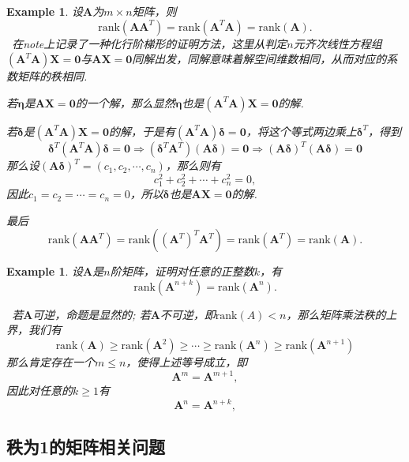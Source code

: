 \documentclass{article}
\newtheorem{example}[theorem]{Example}
\newcommand{\hints}{{\color{blue} \text{hints}}}
\newcommand{\mbf}[1]{\bm{#1}}
\newcommand{\rank}[1]{\text{rank}\left(#1\right)} %
\begin{document}
\begin{example}
\rm 设$\mbf{A}$为$m \times n$矩阵，则
$$
\rank{\mbf{A}\mbf{A}^T} = \rank{\mbf{A}^T\mbf{A}} = \rank{\mbf{A}}. 
$$
\hints\ 在note上记录了一种化行阶梯形的证明方法，这里从判定$n$元齐次线性方程组$(\mbf{A}^T\mbf{A})\mbf{X}=\mbf{0}$与$\mbf{A}\mbf{X}= \mbf{0}$同解出发，同解意味着解空间维数相同，从而对应的系数矩阵的秩相同. 

若$\mbf{\eta}$是$\mbf{A}\mbf{X}= \mbf{0}$的一个解，那么显然$\mbf{\eta}$也是$(\mbf{A}^T\mbf{A})\mbf{X}=\mbf{0}$的解. 

若$\mbf{\delta}$是$(\mbf{A}^T\mbf{A})\mbf{X}=\mbf{0}$的解，于是有$(\mbf{A}^T\mbf{A})\mbf{\delta}=\mbf{0}$，将这个等式两边乘上$\mbf{\delta}^T$，得到
$$
\mbf{\delta}^T(\mbf{A}^T\mbf{A})\mbf{\delta}=\mbf{0} \Rightarrow (\mbf{\delta}^T\mbf{A}^T)(\mbf{A}\mbf{\delta})=\mbf{0} \Rightarrow (\mbf{A}\mbf{\delta})^T(\mbf{A}\mbf{\delta})=\mbf{0}
$$
那么设$(\mbf{A}\mbf{\delta})^T = (c_1,c_2,\cdots,c_n)$，那么则有
$$
c_1^2 + c_2^2 + \cdots + c_n^2 = 0,
$$
因此$c_1 = c_2 = \cdots = c_n = 0$，所以$\mbf{\delta}$也是$\mbf{A}\mbf{X}= \mbf{0}$的解. 

最后
$$
\rank{\mbf{A}\mbf{A}^T} = \rank{(\mbf{A}^T)^T\mbf{A}^T} = \rank{\mbf{A}^T} = \rank{\mbf{A}}.   
$$
\end{example}

\begin{example}
\rm 设$\mbf{A}$是$n$阶矩阵，证明对任意的正整数$k$，有
$$
\rank{\mbf{A}^{n+k}} = \rank{\mbf{A}^n}.
$$

\hints\ 若$\mbf{A}$可逆，命题是显然的; 若$\mbf{A}$不可逆，即$\rank{A} < n$，那么矩阵乘法秩的上界，我们有
$$
\rank{\mbf{A}} \geq \rank{\mbf{A}^2} \geq \cdots \geq \rank{\mbf{A}^n} \geq \rank{\mbf{A}^{n+1}}
$$
那么肯定存在一个$m \leq n$，使得上述等号成立，即
$$
\mbf{A}^m = \mbf{A}^{m+1},
$$
因此对任意的$k \geq 1$有
$$
\mbf{A}^n = \mbf{A}^{n+k},
$$
\end{example}

\subsection{秩为1的矩阵相关问题}
\end{document}
